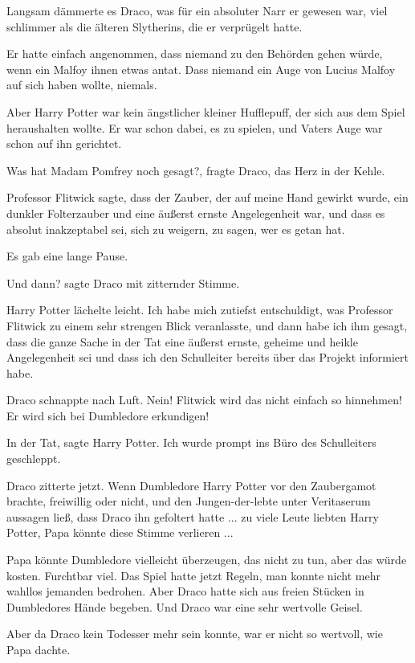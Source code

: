 Langsam dämmerte es Draco, was für ein absoluter Narr er gewesen war, viel
schlimmer als die älteren Slytherins, die er verprügelt hatte.

Er hatte einfach angenommen, dass niemand zu den Behörden gehen würde, wenn ein
Malfoy ihnen etwas antat. Dass niemand ein Auge von Lucius Malfoy auf sich haben
wollte, niemals.

Aber Harry Potter war kein ängstlicher kleiner Hufflepuff, der sich aus dem
Spiel heraushalten wollte. Er war schon dabei, es zu spielen, und Vaters Auge
war schon auf ihn gerichtet.

\glqq{}Was hat Madam Pomfrey noch gesagt?\grqq{}, fragte Draco, das Herz in der
Kehle.

\glqq{}Professor Flitwick sagte, dass der Zauber, der auf meine Hand gewirkt
wurde, ein dunkler Folterzauber und eine äußerst ernste Angelegenheit war, und
dass es absolut inakzeptabel sei, sich zu weigern, zu sagen, wer es getan
hat.\grqq{}

Es gab eine lange Pause.

\glqq{}Und dann?\grqq{} sagte Draco mit zitternder Stimme.

Harry Potter lächelte leicht. \glqq{}Ich habe mich zutiefst entschuldigt, was
Professor Flitwick zu einem sehr strengen Blick veranlasste, und dann habe ich
ihm gesagt, dass die ganze Sache in der Tat eine äußerst ernste, geheime und
heikle Angelegenheit sei und dass ich den Schulleiter bereits über das Projekt
informiert habe.\grqq{}

Draco schnappte nach Luft. \glqq{}Nein! Flitwick wird das nicht einfach so
hinnehmen! Er wird sich bei Dumbledore erkundigen!\grqq{}

\glqq{}In der Tat\grqq{}, sagte Harry Potter. \glqq{}Ich wurde prompt ins Büro
des Schulleiters geschleppt.\grqq{}

Draco zitterte jetzt. Wenn Dumbledore Harry Potter vor den Zaubergamot brachte,
freiwillig oder nicht, und den Jungen-der-lebte unter Veritaserum aussagen ließ,
dass Draco ihn gefoltert hatte ... zu viele Leute liebten Harry Potter, Papa
könnte diese Stimme verlieren ...

Papa könnte Dumbledore vielleicht überzeugen, das nicht zu tun, aber das würde
kosten. Furchtbar viel. Das Spiel hatte jetzt Regeln, man konnte nicht mehr
wahllos jemanden bedrohen. Aber Draco hatte sich aus freien Stücken in
Dumbledores Hände begeben. Und Draco war eine sehr wertvolle Geisel.

Aber da Draco kein Todesser mehr sein konnte, war er nicht so wertvoll, wie
Papa dachte.

